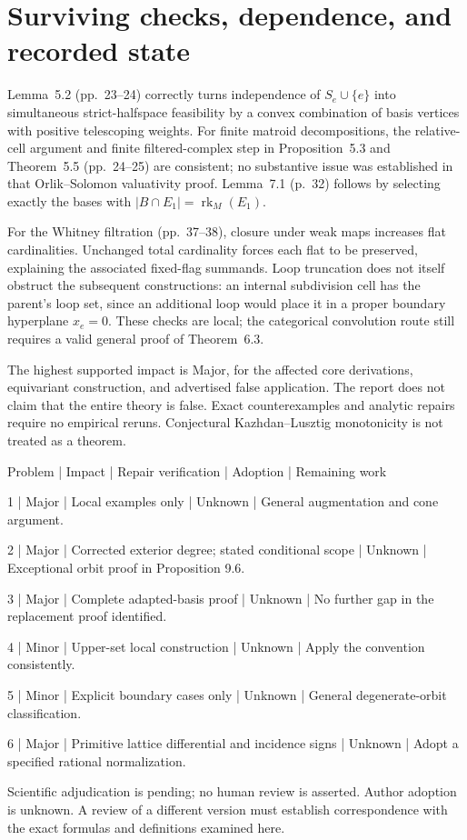 \documentclass[10pt]{article}
\begin{document}
\section*{Surviving checks, dependence, and recorded state}
Lemma 5.2 (pp. 23–24) correctly turns independence of \(S_e\cup\{e\}\) into simultaneous strict-halfspace feasibility by a convex combination of basis vertices with positive telescoping weights. For finite matroid decompositions, the relative-cell argument and finite filtered-complex step in Proposition 5.3 and Theorem 5.5 (pp. 24–25) are consistent; no substantive issue was established in that Orlik–Solomon valuativity proof. Lemma 7.1 (p. 32) follows by selecting exactly the bases with \(|B\cap E_1|=\operatorname{rk}_M(E_1)\).\par
For the Whitney filtration (pp. 37–38), closure under weak maps increases flat cardinalities. Unchanged total cardinality forces each flat to be preserved, explaining the associated fixed-flag summands. Loop truncation does not itself obstruct the subsequent constructions: an internal subdivision cell has the parent’s loop set, since an additional loop would place it in a proper boundary hyperplane \(x_e=0\). These checks are local; the categorical convolution route still requires a valid general proof of Theorem 6.3.\par
The highest supported impact is Major, for the affected core derivations, equivariant construction, and advertised false application. The report does not claim that the entire theory is false. Exact counterexamples and analytic repairs require no empirical reruns. Conjectural Kazhdan–Lusztig monotonicity is not treated as a theorem.\par
Problem | Impact | Repair verification | Adoption | Remaining work\par
1 | Major | Local examples only | Unknown | General augmentation and cone argument.\par
2 | Major | Corrected exterior degree; stated conditional scope | Unknown | Exceptional orbit proof in Proposition 9.6.\par
3 | Major | Complete adapted-basis proof | Unknown | No further gap in the replacement proof identified.\par
4 | Minor | Upper-set local construction | Unknown | Apply the convention consistently.\par
5 | Minor | Explicit boundary cases only | Unknown | General degenerate-orbit classification.\par
6 | Major | Primitive lattice differential and incidence signs | Unknown | Adopt a specified rational normalization.\par
Scientific adjudication is pending; no human review is asserted. Author adoption is unknown. A review of a different version must establish correspondence with the exact formulas and definitions examined here.\par
\end{document}
